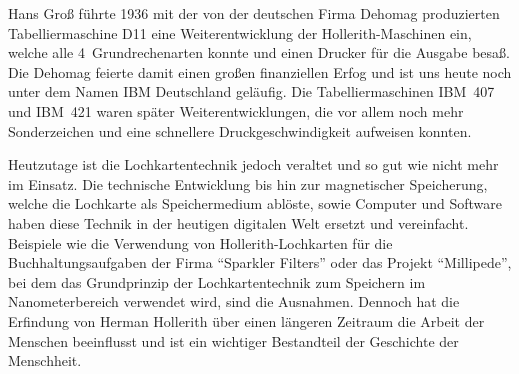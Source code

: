 \documentclass[parskip=half]{scrartcl}
\begin{document}
Hans Groß führte 1936 mit der von der deutschen Firma Dehomag produzierten Tabelliermaschine D11 eine Weiterentwicklung der Hollerith-Maschinen ein, 
welche alle 4~Grundrechenarten konnte und einen Drucker für die Ausgabe besaß. Die Dehomag feierte damit einen großen finanziellen Erfog und ist uns 
heute noch unter dem Namen IBM Deutschland geläufig. Die Tabelliermaschinen IBM~407 und IBM~421 waren später Weiterentwicklungen, die vor allem noch mehr Sonderzeichen und eine schnellere Druckgeschwindigkeit aufweisen konnten.

Heutzutage ist die Lochkartentechnik jedoch veraltet und so gut wie nicht mehr im Einsatz. Die technische Entwicklung bis hin zur 
magnetischer Speicherung, welche die Lochkarte als Speichermedium ablöste, sowie Computer und Software haben diese Technik in der heutigen digitalen Welt ersetzt und vereinfacht.
Beispiele wie die Verwendung von Hollerith-Lochkarten für die Buchhaltungsaufgaben der Firma 
\enquote{Sparkler Filters} oder das Projekt \enquote{Millipede}, bei dem das Grundprinzip der Lochkartentechnik 
zum Speichern im Nanometerbereich verwendet wird, sind die Ausnahmen. Dennoch hat die Erfindung von Herman Hollerith 
über einen längeren Zeitraum die Arbeit der Menschen beeinflusst und ist ein wichtiger Bestandteil der Geschichte der Menschheit.


\printbibliography
\end{document}
